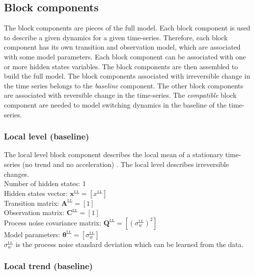 \subsection{Block components}
\label{SS:BlockComponent}
The block components are pieces of the full model.
Each block component is used to describe a given dynamics for a given time-series.
Therefore, each block component has its own transition and observation model, which are associated with some model parameters.
Each block component can be associated with one or more hidden states variables.
The block components are then assembled to build the full model.
The block components associated with irreversible change in the time series belongs to the \emph{baseline} component.
The other block components are associated with reversible change in the time-series.
The \emph{compatible} block component are needed to model switching dynamics in the baseline of the time-series.

\subsubsection{Local level (baseline)}

The local level block component describes the local mean of a stationary time-series (no trend and no acceleration) \cite{STC:STC2035}. 
The local level describes irreversible changes.\\

\noindent
Number of hidden states: 1\\
Hidden states vector: $ \mathbf{x}^{\mathtt{LL}} = [x^{\mathtt{LL}}]$\\
Transition matrix: $\mathbf{A}^{\mathtt{LL}}=[1]$\\
Observation matrix: $\mathbf{C}^{\mathtt{LL}}=[1]$\\
Process noise covariance matrix: $\mathbf{Q}^{\mathtt{LL}}=[(\sigma_{w}^{\mathtt{LL}})^{2}]$\\
Model parameters: $\bm\theta^{\mathtt{LL}}=[\sigma_{w}^{\mathtt{LL}} ]$\\

\noindent
$\sigma_{w}^{\mathtt{LL}}$ is the process noise standard deviation which can be learned from the data.

\subsubsection{Local trend (baseline)}

